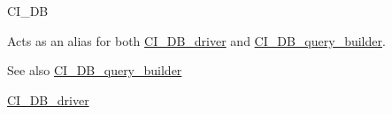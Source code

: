 C\+I\+\_\+\+DB

Acts as an alias for both \mbox{\hyperlink{class_c_i___d_b__driver}{C\+I\+\_\+\+D\+B\+\_\+driver}} and \mbox{\hyperlink{class_c_i___d_b__query__builder}{C\+I\+\_\+\+D\+B\+\_\+query\+\_\+builder}}.

\begin{DoxySeeAlso}{See also}
\mbox{\hyperlink{class_c_i___d_b__query__builder}{C\+I\+\_\+\+D\+B\+\_\+query\+\_\+builder}} 

\mbox{\hyperlink{class_c_i___d_b__driver}{C\+I\+\_\+\+D\+B\+\_\+driver}}
\end{DoxySeeAlso}
